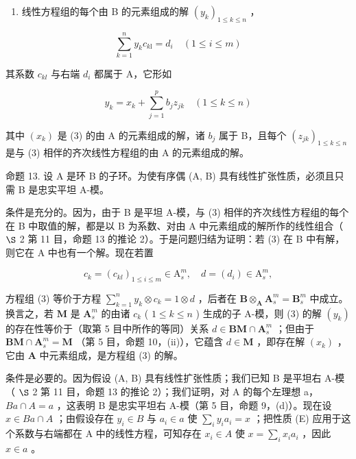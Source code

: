 \begin{enumerate}
\def\labelenumi{(\Alph{enumi})}
\setcounter{enumi}{4}
\tightlist
\item
  线性方程组的每个由 B 的元素组成的解 \((y_{k})_{1\leqslant k\leqslant n}\) ，
\end{enumerate}

\[
\sum_ {k = 1} ^ {n} y _ {k} c _ {k \mathrm{l}} = d _ {i} \quad (1 \leqslant i \leqslant m)\tag{3}
\]

其系数 \(c_{kl}\) 与右端 \(d_{i}\) 都属于 A，它形如

\[
y _ {k} = x _ {k} + \sum_ {j = 1} ^ {p} b _ {j} z _ {j k} \quad (1 \leqslant k \leqslant n)\tag{4}
\]

其中 \((x_{k})\) 是 (3) 的由 A 的元素组成的解，诸 \(b_{j}\) 属于 B，且每个 \((z_{jk})_{1\leq k\leq n}\) 是与 (3) 相伴的齐次线性方程组的由 A 的元素组成的解。

命题 13. 设 A 是环 B 的子环。为使有序偶 (A, B) 具有线性扩张性质，必须且只需 B 是忠实平坦 A-模。

条件是充分的。因为，由于 B 是平坦 A-模，与 (3) 相伴的齐次线性方程组的每个在 B 中取值的解，都是以 B 为系数、对由 A 中元素组成的解所作的线性组合（ \(\S\) 2 第 11 目，命题 13 的推论 2）。于是问题归结为证明：若 (3) 在 B 中有解，则它在 A 中也有一个解。现在若置

\[
c _ {k} = \left(c _ {k l}\right) _ {1 \leqslant i \leqslant m} \in \mathrm{A} _ {s} ^ {m}, \quad d = (d _ {i}) \in \mathrm{A} _ {s} ^ {m},
\]

方程组 (3) 等价于方程 \(\sum_{k=1}^{n} y_k \otimes c_k = 1 \otimes d\) ，后者在 \(\mathbf{B} \otimes_{\mathbf{A}} \mathbf{A}_s^m = \mathbf{B}_s^m\) 中成立。换言之，若 \(\mathbf{M}\) 是 \(\mathbf{A}_s^m\) 的由诸 \(c_k\) ( \(1 \leqslant k \leqslant n\) ) 生成的子 A-模，则 (3) 的解 \((y_k)\) 的存在性等价于（取第 5 目中所作的等同）关系 \(d \in \mathbf{BM} \cap \mathbf{A}_s^m\) ；但由于 \(\mathbf{BM} \cap \mathbf{A}_s^m = \mathbf{M}\) （第 5 目，命题 10，(ii)），它蕴含 \(d \in \mathbf{M}\) ，即存在解 \((x_k)\) ，它由 \(\mathbf{A}\) 中元素组成，是方程组 (3) 的解。

条件是必要的。因为假设 (A, B) 具有线性扩张性质；我们已知 B 是平坦右 A-模（ \(\S\) 2 第 11 目，命题 13 的推论 2）；我们证明，对 A 的每个左理想 a， \(Ba \cap A = a\) ，这表明 B 是忠实平坦右 A-模（第 5 目，命题 9，(d)）。现在设 \(x \in Ba \cap A\) ；由假设存在 \(y_i \in B\) 与 \(a_i \in a\) 使 \(\sum_{i} y_i a_i = x\) ；把性质 (E) 应用于这个系数与右端都在 A 中的线性方程，可知存在 \(x_i \in A\) 使 \(x = \sum_{i} x_i a_i\) ，因此 \(x \in a\) 。

